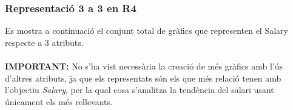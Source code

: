 \documentclass[a4paper, 11pt]{article}
\begin{document}
\begin{figure}[h]   
 \centering
\captionsetup[subfigure]{labelformat=empty}
\end{figure} 
\newpage
\subsubsection{Representació 3 a 3 en R4} \label{Representació 3 a 3 en R4}
Es mostra a continuació el conjunt total de gràfics que representen el Salary respecte a 3 atributs.\\\\
\textbf{IMPORTANT:} No s'ha vist necessària la creació de més gràfics amb l'ús d'altres atributs, ja que els representats són els que més relació tenen amb l'objectiu \textit{Salary}, per la qual cosa s'analitza la tendència del salari usant únicament els més rellevants.
\end{document}
